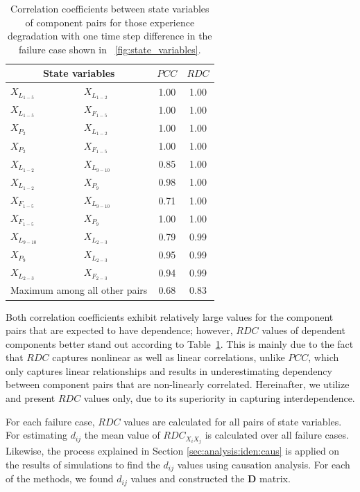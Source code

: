\documentclass[12pt]{elsarticle}
\begin{document}
\begin{table}
\centering
\caption{Correlation coefficients between state variables of component pairs for those experience degradation with one time step difference in the failure case shown in \figurename~\ref{fig:state_variables}.}
\label{tab:cor_state_variables}
\begin{tabular}{ll|cc}
\multicolumn{2}{c|}{State variables} & $PCC$ & $RDC$ \\ \hline
$X_{L_{1-5}}$  & $X_{L_{1-2}}$       & 1.00  & 1.00  \\
$X_{L_{1-5}}$  & $X_{F_{1-5}}$       & 1.00  & 1.00  \\
$X_{P_{2}}$    & $X_{L_{1-2}}$       & 1.00  & 1.00  \\
$X_{P_{2}}$    & $X_{F_{1-5}}$       & 1.00  & 1.00  \\
$X_{L_{1-2}}$  & $X_{L_{9-10}}$      & 0.85  & 1.00  \\
$X_{L_{1-2}}$  & $X_{P_{9}}$         & 0.98  & 1.00  \\
$X_{F_{1-5}}$  & $X_{L_{9-10}}$      & 0.71  & 1.00  \\
$X_{F_{1-5}}$  & $X_{P_{9}}$         & 1.00  & 1.00  \\
$X_{L_{9-10}}$ & $X_{L_{2-3}}$       & 0.79  & 0.99  \\
$X_{P_{9}}$    & $X_{L_{2-3}}$       & 0.95  & 0.99  \\
$X_{L_{2-3}}$  & $X_{F_{2-3}}$       & 0.94  & 0.99  \\[2pt] \hline
\multicolumn{2}{m{0.26\columnwidth}|}{Maximum among all other pairs} & 0.68 & 0.83
\end{tabular}
\end{table}

Both correlation coefficients exhibit relatively large values for the component pairs that are expected to have dependence; however, $RDC$ values of dependent components better stand out according to Table~\ref{tab:cor_state_variables}. This is mainly due to the fact that $RDC$ captures nonlinear as well as linear correlations, unlike $PCC$, which only captures linear relationships and results in underestimating dependency between component pairs that are non-linearly correlated. Hereinafter, we utilize and present $RDC$ values only, due to its superiority in capturing interdependence.

For each failure case, $RDC$ values are calculated for all pairs of state variables. For estimating $d_{ij}$ the mean value of $RDC_{X_i X_j}$ is calculated over all failure cases. Likewise, the process explained in Section \ref{sec:analysis:iden:caus} is applied on the results of simulations to find the $d_{ij}$ values using causation analysis. For each of the methods, we found $d_{ij}$ values and constructed the $\mathbf{D}$ matrix.
\end{document}
